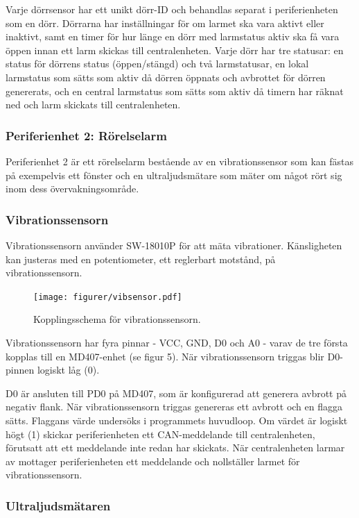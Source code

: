 Varje dörrsensor har ett unikt dörr-ID och behandlas separat i periferienheten som en dörr. Dörrarna har inställningar för om larmet ska vara aktivt eller inaktivt, samt en timer för hur länge en dörr med larmstatus aktiv ska få vara öppen innan ett larm skickas till centralenheten. Varje dörr har tre statusar: en status för dörrens status (öppen/stängd) och två larmstatusar, en lokal larmstatus som sätts som aktiv då dörren öppnats och avbrottet för dörren genererats, och en central larmstatus som sätts som aktiv då timern har räknat ned och larm skickats till centralenheten.

\subsubsection{Periferienhet 2: Rörelselarm}

Periferienhet 2 är ett rörelselarm bestående av en vibrationssensor som kan fästas på exempelvis ett fönster och en ultraljudsmätare som mäter om något rört sig inom dess övervakningsområde.

\subsubsection*{Vibrationssensorn}

Vibrationssensorn använder SW-18010P för att mäta vibrationer. Känsligheten kan justeras med en potentiometer, ett reglerbart motstånd, på vibrationssensorn.

\begin{figure}[h!]
	\centering\texttt{[image: figurer/vibsensor.pdf]}
	\caption{Kopplingsschema för vibrationssensorn.}
	\label{figur:vibsensor}
\end{figure}

Vibrationssensorn har fyra pinnar - VCC, GND, D0 och A0 - varav de tre första kopplas till en MD407-enhet (se figur 5). När vibrationssensorn triggas blir D0-pinnen logiskt låg (0).

D0 är ansluten till PD0 på MD407, som är konfigurerad att generera avbrott på negativ flank. När vibrationssensorn triggas genereras ett avbrott och en flagga sätts.
Flaggans värde undersöks i programmets huvudloop. Om värdet är logiskt högt (1) skickar periferienheten ett CAN-meddelande till centralenheten, förutsatt att ett meddelande inte redan har skickats.
När centralenheten larmar av mottager periferienheten ett meddelande och nollställer larmet för vibrationssensorn.


\subsubsection*{Ultraljudsmätaren}

